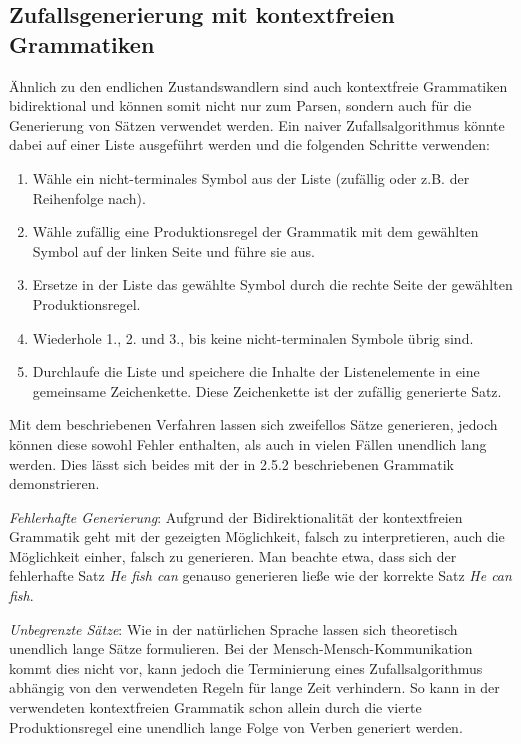 \documentclass[12pt]{report}
\begin{document}
\subsection{Zufallsgenerierung mit kontextfreien \\Grammatiken}
Ähnlich zu den endlichen Zustandswandlern sind auch kontextfreie Grammatiken bidirektional und können somit nicht nur zum Parsen, sondern auch für die Generierung von Sätzen verwendet werden. 
Ein naiver Zufallsalgorithmus könnte dabei auf einer Liste ausgeführt werden und die folgenden Schritte verwenden:

\begin{enumerate}
\item Wähle ein nicht-terminales Symbol aus der Liste (zufällig oder z.B. der Reihenfolge nach).
\item Wähle zufällig eine Produktionsregel der Grammatik mit dem gewählten Symbol auf der linken Seite und führe sie aus. 
\item Ersetze in der Liste das gewählte Symbol durch die rechte Seite der gewählten Produktionsregel.
\item Wiederhole 1., 2. und 3., bis keine nicht-terminalen Symbole übrig sind. 
\item Durchlaufe die Liste und speichere die Inhalte der Listenelemente in eine gemeinsame Zeichenkette. Diese Zeichenkette ist der zufällig generierte Satz. 
\end{enumerate}

Mit dem beschriebenen Verfahren lassen sich zweifellos Sätze generieren, jedoch können diese sowohl Fehler enthalten, als auch in vielen Fällen unendlich lang werden. Dies lässt sich beides mit der in 2.5.2 beschriebenen Grammatik demonstrieren. 

\textit{Fehlerhafte Generierung}: Aufgrund der Bidirektionalität der kontextfreien Grammatik geht mit der gezeigten Möglichkeit, falsch zu interpretieren, auch die Möglichkeit einher, falsch zu generieren. Man beachte etwa, dass sich der fehlerhafte Satz \textit{\glqq  He fish can\grqq{}} genauso generieren ließe wie der korrekte Satz \textit{\glqq  He can fish\grqq{}}.

\textit{Unbegrenzte Sätze}: Wie in der natürlichen Sprache lassen sich theoretisch unendlich lange Sätze formulieren. Bei der Mensch-Mensch-Kommunikation kommt dies nicht vor, kann jedoch die Terminierung eines Zufallsalgorithmus abhängig von den verwendeten Regeln für lange Zeit verhindern. So kann in der verwendeten kontextfreien Grammatik schon allein durch die vierte Produktionsregel eine unendlich lange Folge von Verben generiert werden.
\end{document}
